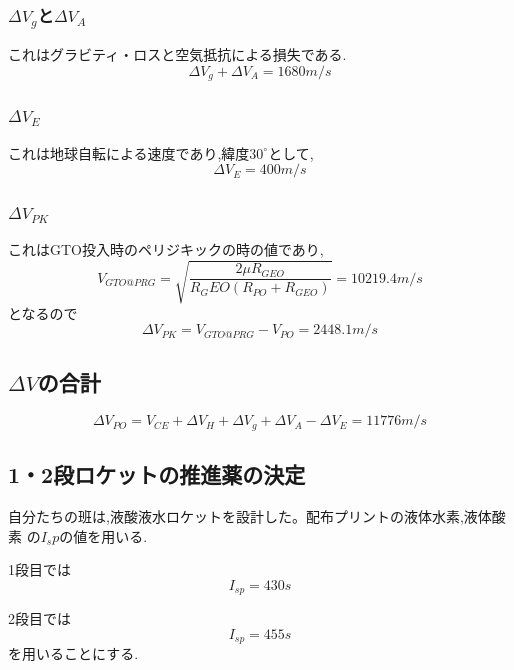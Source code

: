 \subsubsection{$\Delta V_g$と$\Delta V_A$}
これはグラビティ・ロスと空気抵抗による損失である.
\begin{equation}
  \Delta V_g + \Delta V_A = 1680m/s
\end{equation}
\subsubsection{$\Delta V_E$}
これは地球自転による速度であり,緯度$30^\circ$として,
\begin{equation}
  \Delta V_E = 400m/s
\end{equation}
\subsubsection{$\Delta V_{PK}$}
これはGTO投入時のペリジキックの時の値であり,
\begin{equation}
  V_{GTO@PRG} =  \sqrt{\frac{2\mu R_{GEO}}{R_GEO(R_{PO}+R_{GEO})}}=10219.4m/s
\end{equation}
となるので
\begin{equation}
  \Delta V_{PK} = V_{GTO@PRG} - V_{PO} = 2448.1m/s
\end{equation}

\subsection{$\Delta V$の合計}
\begin{equation}
  \Delta V_{PO} =V_{CE} + \Delta V_H + \Delta V_g + \Delta V_A - \Delta V_E = 11776m/s
\end{equation}

\subsection{1・2段ロケットの推進薬の決定}
自分たちの班は,液酸液水ロケットを設計した。配布プリントの液体水素,液体酸素
の$I_sp$の値を用いる.

1段目では
\begin{equation}
  I_{sp} = 430s
\end{equation}

2段目では
\begin{equation}
 I_{sp} = 455s
 \end{equation}
を用いることにする.

